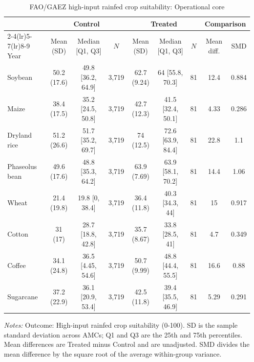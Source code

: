 \begin{table}[!htbp]
\centering
\caption{FAO/GAEZ high-input rainfed crop suitability: Operational core}
\label{tab:polocentro_operational_core_gaez_high_input}
\small
\setlength{\tabcolsep}{4pt}
\begin{tabular}{@{}lcccccccc@{}}
\toprule
& \multicolumn{3}{c}{Control} & \multicolumn{3}{c}{Treated} & \multicolumn{2}{c}{Comparison} \\
\cmidrule(lr){2-4}\cmidrule(lr){5-7}\cmidrule(lr){8-9}
Year & Mean (SD) & Median [Q1, Q3] & $N$ & Mean (SD) & Median [Q1, Q3] & $N$ & Mean diff. & SMD \\
\midrule
Soybean & 50.2 (17.6) & 49.8 [36.2, 64.9] & 3,719 & 62.7 (9.24) & 64 [55.8, 70.3] & 81 & 12.4 & 0.884 \\
Maize & 38.4 (17.5) & 35.2 [24.5, 50.8] & 3,719 & 42.7 (12.3) & 41.5 [32.4, 50.1] & 81 & 4.33 & 0.286 \\
Dryland rice & 51.2 (26.6) & 51.7 [35.2, 69.7] & 3,719 & 74 (12.5) & 72.6 [63.9, 84.4] & 81 & 22.8 & 1.1 \\
Phaseolus bean & 49.6 (17.6) & 48.8 [35.3, 64.2] & 3,719 & 63.9 (7.69) & 63.9 [58.1, 70.2] & 81 & 14.4 & 1.06 \\
Wheat & 21.4 (19.8) & 19.8 [0, 38.4] & 3,719 & 36.4 (11.8) & 40.3 [34.3, 44] & 81 & 15 & 0.917 \\
Cotton & 31 (17) & 28.7 [18.8, 42.8] & 3,719 & 35.7 (8.67) & 33.8 [28.5, 41] & 81 & 4.7 & 0.349 \\
Coffee & 34.1 (24.8) & 36.5 [4.45, 54.6] & 3,719 & 50.7 (9.99) & 48.8 [44.4, 55.5] & 81 & 16.6 & 0.88 \\
Sugarcane & 37.2 (22.9) & 36.1 [20.9, 53.4] & 3,719 & 42.5 (11.8) & 39.4 [35.5, 46.9] & 81 & 5.29 & 0.291 \\
\bottomrule
\end{tabular}
\vspace{2pt}
\begin{minipage}{0.98\linewidth}
\footnotesize \textit{Notes:} Outcome: High-input rainfed crop suitability (0-100). SD is the sample standard deviation across AMCs; Q1 and Q3 are the 25th and 75th percentiles. Mean differences are Treated minus Control and are unadjusted. SMD divides the mean difference by the square root of the average within-group variance.
\end{minipage}
\end{table}